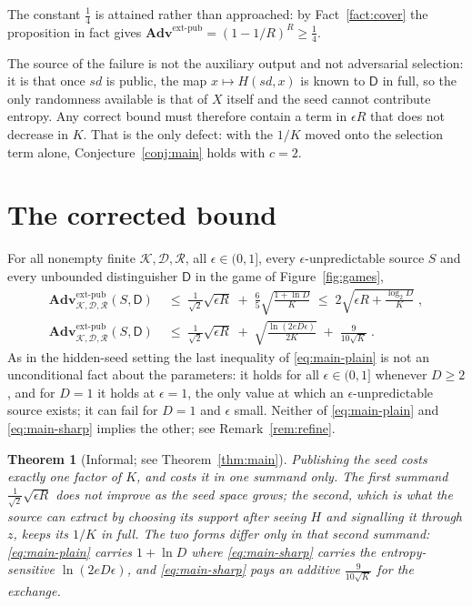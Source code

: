\documentclass{aicr-solution}
\newcommand{\Adv}{\mathbf{Adv}}
\newcommand{\extp}{\mathrm{ext}\text{-}\mathrm{pub}}
\newcommand{\sd}{\mathit{sd}}
\newcommand{\calK}{\mathcal{K}}
\newcommand{\calD}{\mathcal{D}}
\newcommand{\calR}{\mathcal{R}}
\newtheorem*{theoremstar}{Theorem}
\begin{document}
The constant $\tfrac14$ is attained rather than approached: by Fact~\ref{fact:cover} the
proposition in fact gives
$\Adv^{\extp} = (1-1/R)^{R} \ge \tfrac14$.

The source of the failure is not the auxiliary output and not adversarial selection: it is that
once $\sd$ is public, the map $x \mapsto H(\sd,x)$ is known to $\mathsf{D}$ in full, so the only
randomness available is that of $X$ itself and the seed cannot contribute entropy. Any correct
bound must therefore contain a term in $\epsilon R$ that does not decrease in $K$. That is the
only defect: with the $1/K$ moved onto the selection term alone, Conjecture~\ref{conj:main} holds
with $c = 2$.

\section{The corrected bound}\label{sec:corrected}

\begin{theorem}\label{thm:main}
For all nonempty finite $\calK, \calD, \calR$, all $\epsilon \in (0,1]$, every $\epsilon$-unpredictable
source $S$ and every unbounded distinguisher $\mathsf{D}$ in the game of Figure~\ref{fig:games},
\begin{align}
  \Adv^{\extp}_{\calK,\calD,\calR}(S,\mathsf{D})
  &\;\le\; \frac{1}{\sqrt{2}}\sqrt{\epsilon R}
        \;+\; \frac{6}{5}\sqrt{\frac{1 + \ln D}{K}}
  \;\le\; 2\sqrt{\epsilon R + \frac{\log_2 D}{K}} \; ,
  \label{eq:main-plain}\\[2pt]
  \Adv^{\extp}_{\calK,\calD,\calR}(S,\mathsf{D})
  &\;\le\; \frac{1}{\sqrt{2}}\sqrt{\epsilon R}
        \;+\; \sqrt{\frac{\ln(2eD\epsilon)}{2K}} \;+\; \frac{9}{10\sqrt{K}} \; .
  \label{eq:main-sharp}
\end{align}
As in the hidden-seed setting the last inequality of \eqref{eq:main-plain} is not an unconditional
fact about the parameters: it holds for all $\epsilon \in (0,1]$ whenever $D \ge 2$, and for
$D = 1$ it holds at $\epsilon = 1$, the only value at which an $\epsilon$-unpredictable source
exists; it can fail for $D = 1$ and $\epsilon$ small. Neither of
\eqref{eq:main-plain} and \eqref{eq:main-sharp} implies the other; see Remark~\ref{rem:refine}.
\end{theorem}

\begin{theoremstar}[Informal; see Theorem~\ref{thm:main}]
Publishing the seed costs exactly one factor of $K$, and costs it in one summand only. The first
summand $\tfrac{1}{\sqrt{2}}\sqrt{\epsilon R}$ does not improve as the seed space grows; the
second, which is what the source can extract by choosing its support after seeing $H$ and signalling
it through $z$, keeps its $1/K$ in full. The two forms differ only in that second summand:
\eqref{eq:main-plain} carries $1 + \ln D$ where \eqref{eq:main-sharp} carries the
entropy-sensitive $\ln(2eD\epsilon)$, and \eqref{eq:main-sharp} pays an additive
$\tfrac{9}{10\sqrt{K}}$ for the exchange.
\end{theoremstar}
\end{document}
